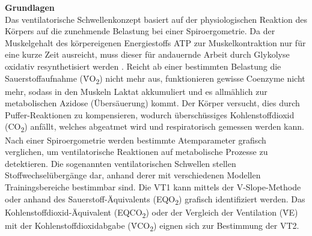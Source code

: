 \textbf{\Large Grundlagen}\\

Das ventilatorische Schwellenkonzept basiert auf der physiologischen Reaktion des Körpers auf die zunehmende Belastung bei einer Spiroergometrie. Da der Muskelgehalt des körpereigenen Energiestoffs ATP zur Muskelkontraktion nur für eine kurze Zeit ausreicht, muss dieser für andauernde Arbeit durch Glykolyse oxidativ resynthetisiert werden \cite{Kroidl.2015}. Reicht ab einer bestimmten Belastung die Sauerstoffaufnahme (\.{V}O\textsubscript{2}) nicht mehr aus, funktionieren gewisse Coenzyme nicht mehr, sodass in den Muskeln Laktat akkumuliert und es allmählich zur metabolischen Azidose (Übersäuerung) kommt. Der Körper versucht, dies durch Puffer-Reaktionen zu kompensieren, wodurch überschüssiges Kohlenstoffdioxid (CO\textsubscript{2}) anfällt, welches abgeatmet wird und respiratorisch gemessen werden kann.\\
Nach einer Spiroergometrie werden bestimmte Atemparameter grafisch verglichen, um ventilatorische Reaktionen auf metabolische Prozesse zu detektieren. Die sogenannten ventilatorischen Schwellen stellen Stoffwechselübergänge dar, anhand derer mit verschiedenen Modellen Trainingsbereiche bestimmbar sind. Die VT1 kann mittels der V-Slope-Methode oder anhand des Sauerstoff-Äquivalents (EQO\textsubscript{2}) grafisch identifiziert werden. Das Kohlenstoffdioxid-Äquivalent (EQCO\textsubscript{2}) oder der Vergleich der Ventilation (\.{V}E) mit der Kohlenstoffdioxidabgabe (\.{V}CO\textsubscript{2}) eignen sich zur Bestimmung der VT2.\\

